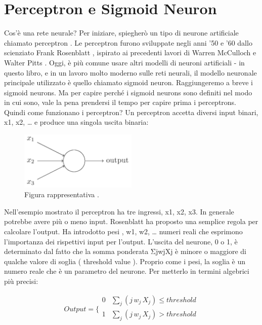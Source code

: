 \chapter{Perceptron e Sigmoid Neuron}



Cos'è una rete neurale? Per iniziare, spiegherò un tipo di neurone artificiale chiamato perceptron . Le perceptron furono sviluppate negli anni '50 e '60 dallo scienziato Frank Rosenblatt , ispirato ai precedenti lavori di Warren McCulloch e Walter Pitts . Oggi, è più comune usare altri modelli di neuroni artificiali - in questo libro, e in un lavoro molto moderno sulle reti neurali, il modello neuronale principale utilizzato è quello chiamato sigmoid neuron. Raggiungeremo a breve i sigmoid neurons. Ma per capire perché i sigmoid neurons sono definiti nel modo in cui sono, vale la pena prendersi il tempo per capire prima i perceptrons.
Quindi come funzionano i perceptron? Un perceptron accetta diversi input binari, x1, x2, … e produce una singola uscita binaria:

\begin{figure}
\includegraphics[width=%
0.5\textwidth]{figures/fig01}
\caption[Idea di un perceptron.]{Figura rappresentativa .
\label{fig:myInlineFigure}}
\end{figure}


Nell'esempio mostrato il perceptron ha tre ingressi, x1, x2, x3. In generale potrebbe avere più o meno input. Rosenblatt ha proposto una semplice regola per calcolare l'output. Ha introdotto pesi , w1, w2, … numeri reali che esprimono l'importanza dei rispettivi input per l'output. L'uscita del neurone, 0 o 1, è determinato dal fatto che la somma ponderata ΣjwjXj è minore o maggiore di qualche valore di soglia ( threshold value ). Proprio come i pesi, la soglia è un numero reale che è un parametro del neurone. Per metterlo in termini algebrici più precisi:

$$Output =
\bigg \{
\begin{array}{rl}
0 & \sum_j ( j \, w_j \, X_j ) \le threshold \\
1 & \sum_j ( j \, w_j \, X_j ) > threshold \\
\end{array}
$$

